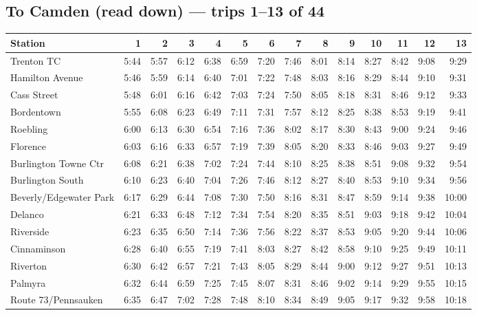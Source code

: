 \subsection*{To Camden (read down) --- trips 1--13 of 44}
\begin{center}\footnotesize\setlength{\tabcolsep}{3pt}\begin{tabular}{@{}lrrrrrrrrrrrrr@{}}\toprule
Station & 1 & 2 & 3 & 4 & 5 & 6 & 7 & 8 & 9 & 10 & 11 & 12 & 13 \\\midrule
Trenton TC & 5:44 & 5:57 & 6:12 & 6:38 & 6:59 & 7:20 & 7:46 & 8:01 & 8:14 & 8:27 & 8:42 & 9:08 & 9:29 \\
Hamilton Avenue & 5:46 & 5:59 & 6:14 & 6:40 & 7:01 & 7:22 & 7:48 & 8:03 & 8:16 & 8:29 & 8:44 & 9:10 & 9:31 \\
Cass Street & 5:48 & 6:01 & 6:16 & 6:42 & 7:03 & 7:24 & 7:50 & 8:05 & 8:18 & 8:31 & 8:46 & 9:12 & 9:33 \\
Bordentown & 5:55 & 6:08 & 6:23 & 6:49 & 7:11 & 7:31 & 7:57 & 8:12 & 8:25 & 8:38 & 8:53 & 9:19 & 9:41 \\
Roebling & 6:00 & 6:13 & 6:30 & 6:54 & 7:16 & 7:36 & 8:02 & 8:17 & 8:30 & 8:43 & 9:00 & 9:24 & 9:46 \\
Florence & 6:03 & 6:16 & 6:33 & 6:57 & 7:19 & 7:39 & 8:05 & 8:20 & 8:33 & 8:46 & 9:03 & 9:27 & 9:49 \\
Burlington Towne Ctr & 6:08 & 6:21 & 6:38 & 7:02 & 7:24 & 7:44 & 8:10 & 8:25 & 8:38 & 8:51 & 9:08 & 9:32 & 9:54 \\
Burlington South & 6:10 & 6:23 & 6:40 & 7:04 & 7:26 & 7:46 & 8:12 & 8:27 & 8:40 & 8:53 & 9:10 & 9:34 & 9:56 \\
Beverly/Edgewater Park & 6:17 & 6:29 & 6:44 & 7:08 & 7:30 & 7:50 & 8:16 & 8:31 & 8:47 & 8:59 & 9:14 & 9:38 & 10:00 \\
Delanco & 6:21 & 6:33 & 6:48 & 7:12 & 7:34 & 7:54 & 8:20 & 8:35 & 8:51 & 9:03 & 9:18 & 9:42 & 10:04 \\
Riverside & 6:23 & 6:35 & 6:50 & 7:14 & 7:36 & 7:56 & 8:22 & 8:37 & 8:53 & 9:05 & 9:20 & 9:44 & 10:06 \\
Cinnaminson & 6:28 & 6:40 & 6:55 & 7:19 & 7:41 & 8:03 & 8:27 & 8:42 & 8:58 & 9:10 & 9:25 & 9:49 & 10:11 \\
Riverton & 6:30 & 6:42 & 6:57 & 7:21 & 7:43 & 8:05 & 8:29 & 8:44 & 9:00 & 9:12 & 9:27 & 9:51 & 10:13 \\
Palmyra & 6:32 & 6:44 & 6:59 & 7:25 & 7:45 & 8:07 & 8:31 & 8:46 & 9:02 & 9:14 & 9:29 & 9:55 & 10:15 \\
Route 73/Pennsauken & 6:35 & 6:47 & 7:02 & 7:28 & 7:48 & 8:10 & 8:34 & 8:49 & 9:05 & 9:17 & 9:32 & 9:58 & 10:18 \\

\end{tabular}
\end{center}
